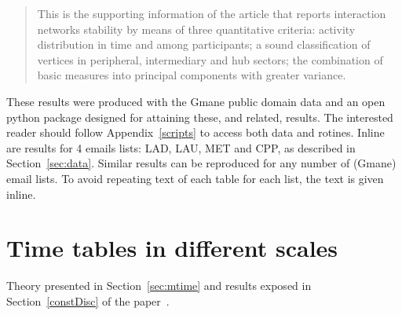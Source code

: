 \documentclass[%
 aip,
 jmp,%
 amsmath,amssymb,
 reprint,%
 floatfix,
]{revtex4-1}
\begin{document}


\date{\today}%

\begin{abstract}
 This is the supporting information of the article that reports interaction networks stability by means of three quantitative criteria: activity distribution in time and among participants; a sound classification of vertices in peripheral, intermediary and hub sectors; the combination of basic measures into principal components with greater variance. 
\end{abstract}

\maketitle

These results were produced with the Gmane public domain data and an open python package designed for attaining
these, and related, results. The interested reader should follow Appendix~\ref{scripts} to access both data and rotines.
Inline are results for 4 emails lists: LAD, LAU, MET and CPP, as described in Section~\ref{sec:data}.
Similar results can be reproduced for any number of (Gmane) email lists.
To avoid repeating text of each table for each list, the text is given inline.

\section{Time tables in different scales}\label{sec:time}
Theory presented in Section~\ref{sec:mtime} and results exposed in Section~\ref{constDisc} of the paper~\cite{tpaper}.
\end{document}
